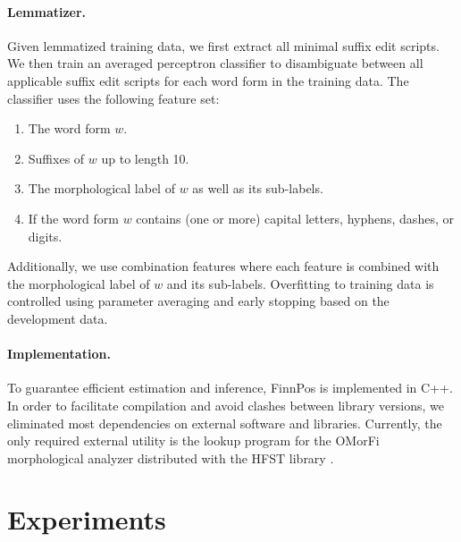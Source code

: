 \documentclass[smallextended]{svjour3}       %
\begin{document}
\paragraph{Lemmatizer.}

Given lemmatized training data, we first extract all minimal suffix
edit scripts. We then train an averaged perceptron classifier \citep{freund1999} to
disambiguate between all applicable suffix edit scripts for each word
form in the training data. %
The classifier uses the following feature set:
\begin{enumerate}
\item The word form $w$.
\item Suffixes of $w$ up to length 10.
\item The morphological label of $w$ as well as its sub-labels.
\item If the word form $w$ contains (one or more) capital letters,
  hyphens, dashes, or digits.
\end{enumerate}
Additionally, we use combination features where each feature is
combined with the morphological label of $w$ and its sub-labels. 
Overfitting to training data is controlled using parameter averaging and
early stopping based on the development data.


\paragraph{Implementation.} To guarantee efficient estimation
and inference, FinnPos is implemented in C++. In order to
facilitate compilation and avoid clashes between library versions, we
eliminated most dependencies on external software and
libraries. Currently, the only required external utility is the lookup
program for the OMorFi morphological analyzer distributed with the
HFST library \citep{linden2011}.





\section{Experiments}
\label{sec: experiments}
\end{document}
